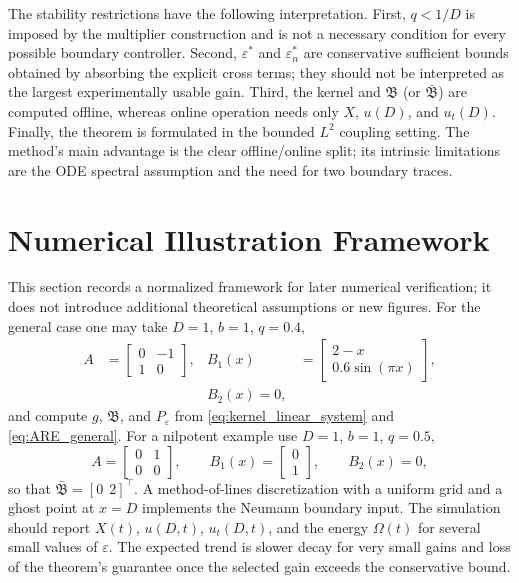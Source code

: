 \documentclass[journal]{IEEEtran}
\newcommand{\eps}{\varepsilon}
\newcommand{\Bcal}{\mathfrak B}
\newcommand{\Bbar}{\bar{\mathfrak B}}
\begin{document}
The stability restrictions have the following interpretation. First, \(q<1/D\) is imposed by the multiplier construction and is not a necessary condition for every possible boundary controller. Second, \(\eps^*\) and \(\eps_n^*\) are conservative sufficient bounds obtained by absorbing the explicit cross terms; they should not be interpreted as the largest experimentally usable gain. Third, the kernel and \(\Bcal\) (or \(\Bbar\)) are computed offline, whereas online operation needs only \(X\), \(u(D)\), and \(u_t(D)\). Finally, the theorem is formulated in the bounded \(L^2\) coupling setting. The method's main advantage is the clear offline/online split; its intrinsic limitations are the ODE spectral assumption and the need for two boundary traces.

\section{Numerical Illustration Framework}

This section records a normalized framework for later numerical verification; it does not introduce additional theoretical assumptions or new figures. For the general case one may take \(D=1\), \(b=1\), \(q=0.4\),
\begin{align}
 A&=\begin{bmatrix}0&-1\\1&0\end{bmatrix},
 &B_1(x)&=\begin{bmatrix}2-x\\0.6\sin(\pi x)\end{bmatrix}, \nonumber\\
 &&B_2(x)=0,
\end{align}
and compute \(g\), \(\Bcal\), and \(P_\eps\) from \eqref{eq:kernel_linear_system} and \eqref{eq:ARE_general}. For a nilpotent example use \(D=1\), \(b=1\), \(q=0.5\),
\begin{equation}
 A=\begin{bmatrix}0&1\\0&0\end{bmatrix},\qquad B_1(x)=\begin{bmatrix}0\\1\end{bmatrix},\qquad B_2(x)=0,
\end{equation}
so that \(\Bbar=[0\ \ 2]^\top\). A method-of-lines discretization with a uniform grid and a ghost point at \(x=D\) implements the Neumann boundary input. The simulation should report \(X(t)\), \(u(D,t)\), \(u_t(D,t)\), and the energy \(\Omega(t)\) for several small values of \(\eps\). The expected trend is slower decay for very small gains and loss of the theorem's guarantee once the selected gain exceeds the conservative bound.
\end{document}
